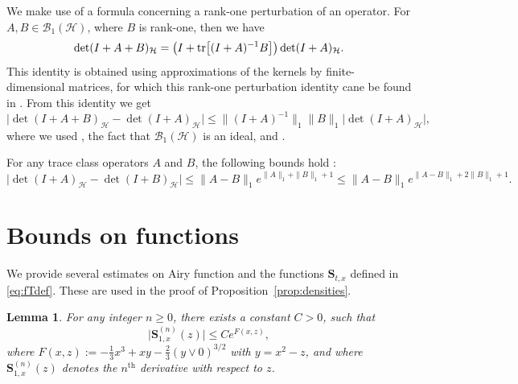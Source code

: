 \documentclass[oneside,final,11pt]{amsart}
\newtheorem{lem}[thm]{Lemma}
\theoremstyle{definition}
\newcommand{\CH}{\mathcal{H}}
\newcommand{\CB}{\mathcal{B}}
\newcommand{\1}[1]{\mathbf{1}_{#1}}
\newcommand{\km}[1]{\marginnote{\tiny{\color{red}[KM: #1]}}}
\newcommand{\uptext}[1]{\text{\upshape{#1}}}
\DeclareMathOperator{\tr}{\mathop{\uptext{tr}}}
\newcommand{\fT}{\mathbf{S}}
\numberwithin{equation}{section}
\begin{document}
We make use of a formula concerning a rank-one perturbation of an operator. %
For $A, B \in \CB_1(\CH)$, where $B$ is rank-one, then we have
\begin{equation}\label{eq:Fredholm_rank1}
\det (I + A + B)_{\CH} = \bigl(I + \tr \bigl[(I+A)^{-1} B\bigr]\bigr) \det(I + A)_{\CH}.
\end{equation}
This identity is obtained using approximations of the kernels by finite-dimensional matrices, for which this rank-one perturbation identity cane be found in \cite[p.~475]{Meyer}. From this identity we get
\begin{equation}
\bigl| \det (I + A + B)_{\CH} - \det (I + A)_{\CH} \bigr| \leq \| (I+A)^{-1} \|_1 \| B\|_1 \bigl|\det(I + A)_{\CH}\bigr|, \label{eq:det_bound_trace}
\end{equation}
where we used \cite[Eq.~3.1]{Simon}, the fact that $\CB_1(\CH)$ is an ideal, and \cite[Eq.~3.6]{Simon}.

For any trace class operators $A$ and $B$, the following bounds hold \cite[Theorem~3.4]{Simon}:
\begin{equation}\label{eq:det_bound}
\bigl| \det (I + A)_{\CH} - \det (I + B)_{\CH} \bigr| \leq \| A - B\|_1 e^{\| A\|_1 + \|B\|_1 + 1} \leq \| A - B\|_1 e^{\| A - B\|_1 + 2 \|B\|_1 + 1}.
\end{equation}

\section{Bounds on functions}
\label{sec:kernels_bounds}

We provide several estimates on Airy function and the functions $\fT_{t,x}$ defined in \eqref{eq:fTdef}. These are used in the proof of Proposition~\ref{prop:densities}.

\begin{lem}\label{lem:S_bound}
For any integer $n \geq 0$, there exists a constant $C > 0$, such that
\begin{equation}\label{eq:S_bound}
\bigl|\fT^{(n)}_{1,x}(z)\bigr| \leq C e^{F(x, z)},
\end{equation}
where $F(x, z) := -\tfrac{1}{3} x^3 + x y - \tfrac{2}{3} (y \vee 0)^{3 / 2}$ with $y = x^2 - z$, and where $\fT^{(n)}_{1,x}(z)$ denotes the $n^{\text{th}}$ derivative with respect to $z$.
\end{lem}
\end{document}
